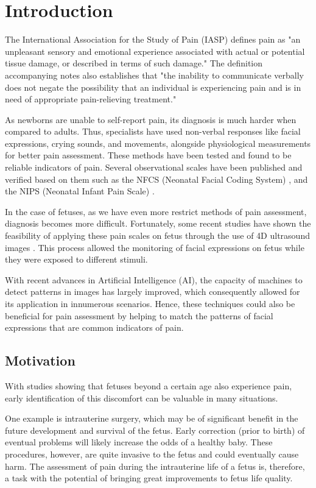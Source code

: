 \chapter{Introduction}

The International Association for the Study of Pain (IASP) defines pain as "an unpleasant sensory and emotional experience associated with actual or potential tissue damage, or described in terms of such damage." \citep{merskey1994classification} The definition accompanying notes also establishes that "the inability to communicate verbally does not negate the possibility that an individual is experiencing pain and is in need of appropriate pain-relieving treatment."

As newborns are unable to self-report pain, its diagnosis is much harder when compared to adults. Thus, specialists have used non-verbal responses like facial expressions, crying sounds, and movements, alongside physiological measurements for better pain assessment. These methods have been tested and found to be reliable indicators of pain. Several observational scales have been published and verified based on them such as the NFCS (Neonatal Facial Coding System) \citep{Grunau1998}, and the NIPS (Neonatal Infant Pain Scale) \citep{HudsonBarr2002}.

In the case of fetuses, as we have even more restrict methods of pain assessment, diagnosis becomes more difficult. Fortunately, some recent studies have shown the feasibility of applying these pain scales on fetus through the use of 4D ultrasound images \citep{bernardes2018feasibility}. This process allowed the monitoring of facial expressions on fetus while they were exposed to different stimuli.

With recent advances in Artificial Intelligence (AI), the capacity of machines to detect patterns in images has largely improved, which consequently allowed for its application in innumerous scenarios. Hence, these techniques could also be beneficial for pain assessment by helping to match the patterns of facial expressions that are common indicators of pain.

\section{Motivation}

With studies showing that fetuses beyond a certain age also experience pain, early identification of this discomfort can be valuable in many situations.

One example is intrauterine surgery, which may be of significant benefit in the future development and survival of the fetus. Early correction (prior to birth) of eventual problems will likely increase the odds of a healthy baby. These procedures, however, are quite invasive to the fetus and could eventually cause harm. The assessment of pain during the intrauterine life of a fetus is, therefore, a task with the potential of bringing great improvements to fetus life quality. 

